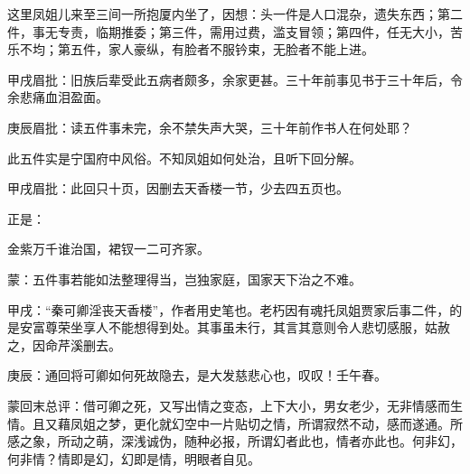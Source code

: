 \begin{parag}
    这里凤姐儿来至三间一所抱厦内坐了，因想：头一件是人口混杂，遗失东西；第二件，事无专责，临期推委；第三件，需用过费，滥支冒领；第四件，任无大小，苦乐不均；第五件，家人豪纵，有脸者不服钤束，无脸者不能上进。\begin{note}甲戌眉批：旧族后辈受此五病者颇多，余家更甚。三十年前事见书于三十年后，令余悲痛血泪盈面。\end{note}\begin{note}庚辰眉批：读五件事未完，余不禁失声大哭，三十年前作书人在何处耶？\end{note}此五件实是宁国府中风俗。不知凤姐如何处治，且听下回分解。\begin{note}甲戌眉批：此回只十页，因删去天香楼一节，少去四五页也。\end{note}
\end{parag}


\begin{parag}
    正是：
\end{parag}
\begin{poem}
    \begin{pl} 金紫万千谁治国，裙钗一二可齐家。\end{pl}
    \begin{note}蒙：五件事若能如法整理得当，岂独家庭，国家天下治之不难。\end{note}
\end{poem}

\begin{parag}
    \begin{note}甲戌：“秦可卿淫丧天香楼”，作者用史笔也。老朽因有魂托凤姐贾家后事二件，的是安富尊荣坐享人不能想得到处。其事虽未行，其言其意则令人悲切感服，姑赦之，因命芹溪删去。\end{note}
\end{parag}


\begin{parag}
    \begin{note}庚辰：通回将可卿如何死故隐去，是大发慈悲心也，叹叹！壬午春。\end{note}
\end{parag}


\begin{parag}
    \begin{note}蒙回末总评：借可卿之死，又写出情之变态，上下大小，男女老少，无非情感而生情。且又藉凤姐之梦，更化就幻空中一片贴切之情，所谓寂然不动，感而遂通。所感之象，所动之萌，深浅诚伪，随种必报，所谓幻者此也，情者亦此也。何非幻，何非情？情即是幻，幻即是情，明眼者自见。\end{note}
\end{parag}

